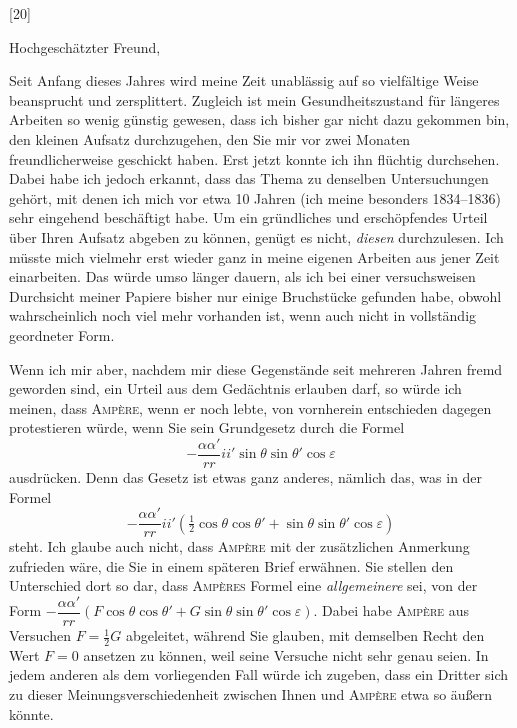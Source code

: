 \begin{center}[20]\par{}\end{center}
Hochgeschätzter Freund,

Seit Anfang dieses Jahres wird meine Zeit unablässig auf so vielfältige Weise beansprucht und zersplittert. Zugleich ist mein Gesundheitszustand für längeres Arbeiten so wenig günstig gewesen, dass ich bisher gar nicht dazu gekommen bin, den kleinen Aufsatz durchzugehen, den Sie mir vor zwei Monaten freundlicherweise geschickt haben. Erst jetzt konnte ich ihn flüchtig durchsehen. Dabei habe ich jedoch erkannt, dass das Thema zu denselben Untersuchungen gehört, mit denen ich mich vor etwa 10 Jahren (ich meine besonders 1834–1836) sehr eingehend beschäftigt habe. Um ein gründliches und erschöpfendes Urteil über Ihren Aufsatz abgeben zu können, genügt es nicht, \textit{diesen} durchzulesen. Ich müsste mich vielmehr erst wieder ganz in meine eigenen Arbeiten aus jener Zeit einarbeiten. Das würde umso länger dauern, als ich bei einer versuchsweisen Durchsicht meiner Papiere bisher nur einige Bruchstücke gefunden habe, obwohl wahrscheinlich noch viel mehr vorhanden ist, wenn auch nicht in vollständig geordneter Form.

Wenn ich mir aber, nachdem mir diese Gegenstände seit mehreren Jahren fremd geworden sind, ein Urteil aus dem Gedächtnis erlauben darf, so würde ich meinen, dass \textsc{Ampère}, wenn er noch lebte, von vornherein entschieden dagegen protestieren würde, wenn Sie sein Grundgesetz durch die Formel
\[
-\frac{\alpha\alpha'}{rr}ii'\sin\theta\sin\theta'\cos\varepsilon\tag*{(I)}
\]
ausdrücken. Denn das Gesetz ist etwas ganz anderes, nämlich das, was in der Formel
\[
-\frac{\alpha\alpha'}{rr}ii'\left(\tfrac12\cos\theta\cos\theta'+\sin\theta\sin\theta'\cos\varepsilon\right)\tag*{(II)}
\]
steht. Ich glaube auch nicht, dass \textsc{Ampère} mit der zusätzlichen Anmerkung zufrieden wäre, die Sie in einem späteren Brief erwähnen. Sie stellen den Unterschied dort so dar, dass \textsc{Ampères} Formel eine \textit{allgemeinere} sei, von der Form $-\dfrac{\alpha\alpha'}{rr}(F\cos\theta\cos\theta'+G\sin\theta\sin\theta'\cos\varepsilon)$. Dabei habe \textsc{Ampère} aus Versuchen $F=\tfrac12G$ abgeleitet, während Sie glauben, mit demselben Recht den Wert $F=0$ ansetzen zu können, weil seine Versuche nicht sehr genau seien. In jedem anderen als dem vorliegenden Fall würde ich zugeben, dass ein Dritter sich zu dieser Meinungsverschiedenheit zwischen Ihnen und \textsc{Ampère} etwa so äußern könnte.

